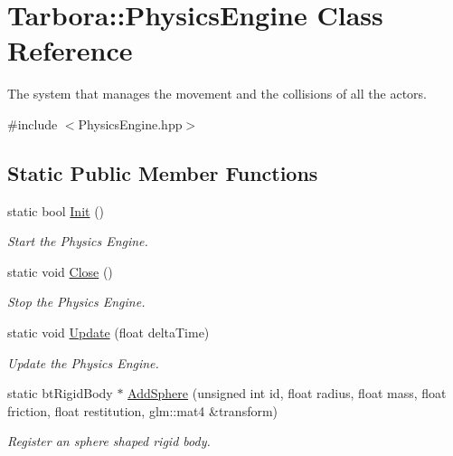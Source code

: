 \hypertarget{classTarbora_1_1PhysicsEngine}{}\section{Tarbora\+:\+:Physics\+Engine Class Reference}
\label{classTarbora_1_1PhysicsEngine}


The system that manages the movement and the collisions of all the actors.  




{\ttfamily \#include $<$Physics\+Engine.\+hpp$>$}

\subsection*{Static Public Member Functions}
\begin{DoxyCompactItemize}
\item 
static bool \hyperlink{classTarbora_1_1PhysicsEngine_a7ec00bd287d1366ce059f2821b023634}{Init} ()
\begin{DoxyCompactList}\small\item\em Start the Physics Engine. \end{DoxyCompactList}\item 
\mbox{\label{classTarbora_1_1PhysicsEngine_ae7c68706207e34b87dabf53fbf6886d1}} 
static void \hyperlink{classTarbora_1_1PhysicsEngine_ae7c68706207e34b87dabf53fbf6886d1}{Close} ()
\begin{DoxyCompactList}\small\item\em Stop the Physics Engine. \end{DoxyCompactList}\item 
\mbox{\label{classTarbora_1_1PhysicsEngine_aecd7f940778147cff721cf877fefe046}} 
static void \hyperlink{classTarbora_1_1PhysicsEngine_aecd7f940778147cff721cf877fefe046}{Update} (float delta\+Time)
\begin{DoxyCompactList}\small\item\em Update the Physics Engine. \end{DoxyCompactList}\item 
static bt\+Rigid\+Body $\ast$ \hyperlink{classTarbora_1_1PhysicsEngine_ab20c015fd1b1aa9d8dd8e0c10a9ef249}{Add\+Sphere} (unsigned int id, float radius, float mass, float friction, float restitution, glm\+::mat4 \&transform)
\begin{DoxyCompactList}\small\item\em Register an sphere shaped rigid body. \end{DoxyCompactList}\item 

\end{DoxyCompactItemize}
